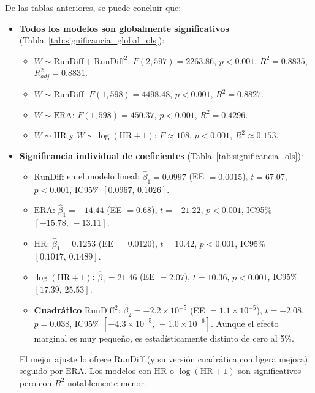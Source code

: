 \documentclass[man,floatsintext]{apa7}
\begin{document}




De las tablas anteriores, se puede concluir que:
\begin{itemize}
    \item \textbf{Todos los modelos son globalmente significativos} (Tabla~\ref{tab:significancia_global_ols}):
    \begin{itemize}
        \item \(W \sim \text{RunDiff} + \text{RunDiff}^2\): \(F(2,597)=2263.86\), \(p<0.001\), \(R^2=0.8835\), \(R^2_{adj}=0.8831\).
        \item \(W \sim \text{RunDiff}\): \(F(1,598)=4498.48\), \(p<0.001\), \(R^2=0.8827\).
        \item \(W \sim \text{ERA}\): \(F(1,598)=450.37\), \(p<0.001\), \(R^2=0.4296\).
        \item \(W \sim \text{HR}\) y \(W \sim \log(\text{HR}+1)\): \(F\approx 108\), \(p<0.001\), \(R^2\approx 0.153\).
    \end{itemize}

    \item \textbf{Significancia individual de coeficientes} (Tabla~\ref{tab:significancia_ols}):
    \begin{itemize}
        \item \(\text{RunDiff}\) en el modelo lineal: \(\hat\beta_1=0.0997\) (EE \(=0.0015\)), \(t=67.07\), \(p<0.001\), IC95\% \([0.0967,\,0.1026]\). 
        \item \(\text{ERA}\): \(\hat\beta_1=-14.44\) (EE \(=0.68\)), \(t=-21.22\), \(p<0.001\), IC95\% \([-15.78,\,-13.11]\).
        \item \(\text{HR}\): \(\hat\beta_1=0.1253\) (EE \(=0.0120\)), \(t=10.42\), \(p<0.001\), IC95\% \([0.1017,\,0.1489]\).
        \item \(\log(\text{HR}+1)\): \(\hat\beta_1=21.46\) (EE \(=2.07\)), \(t=10.36\), \(p<0.001\), IC95\% \([17.39,\,25.53]\).
        \item \textbf{Cuadrático} \(\text{RunDiff}^2\): \(\hat\beta_2=-2.2\times 10^{-5}\) (EE \(=1.1\times10^{-5}\)), \(t=-2.08\), \(p=0.038\), IC95\% \([-4.3\times10^{-5},\,-1.0\times10^{-6}]\). Aunque el efecto marginal es muy pequeño, es estadísticamente distinto de cero al 5\%.
    \end{itemize}

    El mejor ajuste lo ofrece \(\text{RunDiff}\) (y su versión cuadrática con ligera mejora), seguido por \(\text{ERA}\). Los modelos con \(\text{HR}\) o \(\log(\text{HR}+1)\) son significativos pero con \(R^2\) notablemente menor.
\end{itemize}
\end{document}
